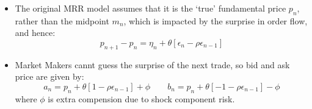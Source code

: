 \begin{mysetting}
	\begin{itemize}
		\item The original MRR model assumes that it is the ‘true’ fundamental price $p_n$, rather
		than the midpoint $m_n$, which is impacted by the surprise in order flow, and hence:
		\[
		p_{n+1} - p_n = \eta_n + \theta[\epsilon_n - \rho \epsilon_{n-1}]
		\]
		\item Market Makers cannt guess the surprise of the next trade, so bid and ask price are given by:
		\[
		a_n = p_n + \theta[1- \rho \epsilon_{n-1}] + \phi \qquad b_n = p_n + \theta[- 1- \rho \epsilon_{n-1}] - \phi 
		\]
		where $\phi$ is extra compension due to shock component risk.
	\end{itemize}
\end{mysetting}

